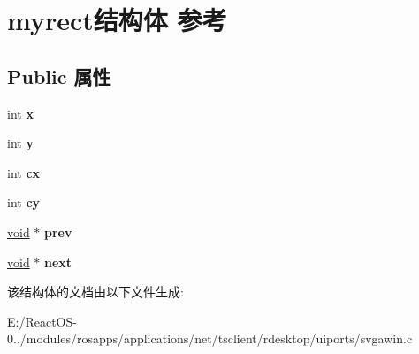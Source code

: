 \hypertarget{structmyrect}{}\section{myrect结构体 参考}
\label{structmyrect}
\subsection*{Public 属性}
\begin{DoxyCompactItemize}
\item 
\mbox{\label{structmyrect_a1928b5ceef2045cd44abc838aa2d4704}} 
int {\bfseries x}
\item 
\mbox{\label{structmyrect_a9b1573cd728c24eaa3b3fbdda8f590e6}} 
int {\bfseries y}
\item 
\mbox{\label{structmyrect_ad64ccf69f3284ca1ad1c1a6d5bf52078}} 
int {\bfseries cx}
\item 
\mbox{\label{structmyrect_a01b290a188ebe3682746c298cc9e84c2}} 
int {\bfseries cy}
\item 
\mbox{\label{structmyrect_a089617896ab0d1625b66de82d72b750c}} 
\hyperlink{interfacevoid}{void} $\ast$ {\bfseries prev}
\item 
\mbox{\label{structmyrect_a3f509291f062ffec84669de8d29f4674}} 
\hyperlink{interfacevoid}{void} $\ast$ {\bfseries next}
\end{DoxyCompactItemize}


该结构体的文档由以下文件生成\+:\begin{DoxyCompactItemize}
\item 
E\+:/\+React\+O\+S-\/0../modules/rosapps/applications/net/tsclient/rdesktop/uiports/svgawin.\+c\end{DoxyCompactItemize}
